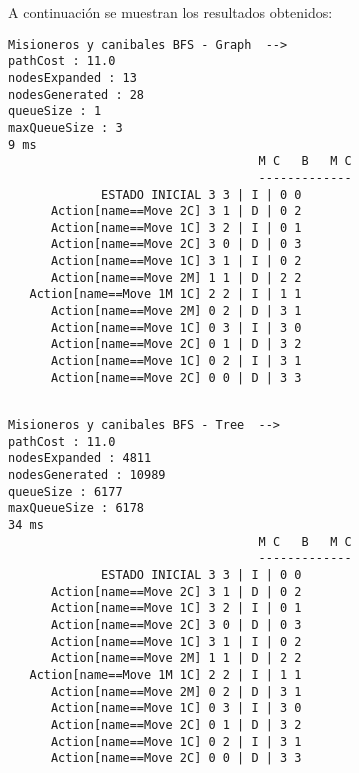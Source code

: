 \documentclass{article}
\begin{document}
A continuación se muestran los resultados obtenidos:
\begin{multicols}{2}

\begin{Verbatim}[fontsize=\footnotesize]
Misioneros y canibales BFS - Graph  -->
pathCost : 11.0
nodesExpanded : 13
nodesGenerated : 28
queueSize : 1
maxQueueSize : 3
9 ms
                                   M C   B   M C
                                   -------------
             ESTADO INICIAL	3 3 | I | 0 0
      Action[name==Move 2C]	3 1 | D | 0 2
      Action[name==Move 1C]	3 2 | I | 0 1
      Action[name==Move 2C]	3 0 | D | 0 3
      Action[name==Move 1C]	3 1 | I | 0 2
      Action[name==Move 2M]	1 1 | D | 2 2
   Action[name==Move 1M 1C]	2 2 | I | 1 1
      Action[name==Move 2M]	0 2 | D | 3 1
      Action[name==Move 1C]	0 3 | I | 3 0
      Action[name==Move 2C]	0 1 | D | 3 2
      Action[name==Move 1C]	0 2 | I | 3 1
      Action[name==Move 2C]	0 0 | D | 3 3
      
\end{Verbatim}



\begin{Verbatim}[fontsize=\footnotesize]
Misioneros y canibales BFS - Tree  -->
pathCost : 11.0
nodesExpanded : 4811
nodesGenerated : 10989
queueSize : 6177
maxQueueSize : 6178
34 ms
                                   M C   B   M C
                                   -------------
             ESTADO INICIAL	3 3 | I | 0 0
      Action[name==Move 2C]	3 1 | D | 0 2
      Action[name==Move 1C]	3 2 | I | 0 1
      Action[name==Move 2C]	3 0 | D | 0 3
      Action[name==Move 1C]	3 1 | I | 0 2
      Action[name==Move 2M]	1 1 | D | 2 2
   Action[name==Move 1M 1C]	2 2 | I | 1 1
      Action[name==Move 2M]	0 2 | D | 3 1
      Action[name==Move 1C]	0 3 | I | 3 0
      Action[name==Move 2C]	0 1 | D | 3 2
      Action[name==Move 1C]	0 2 | I | 3 1
      Action[name==Move 2C]	0 0 | D | 3 3
\end{Verbatim}
\end{multicols}
\end{document}
